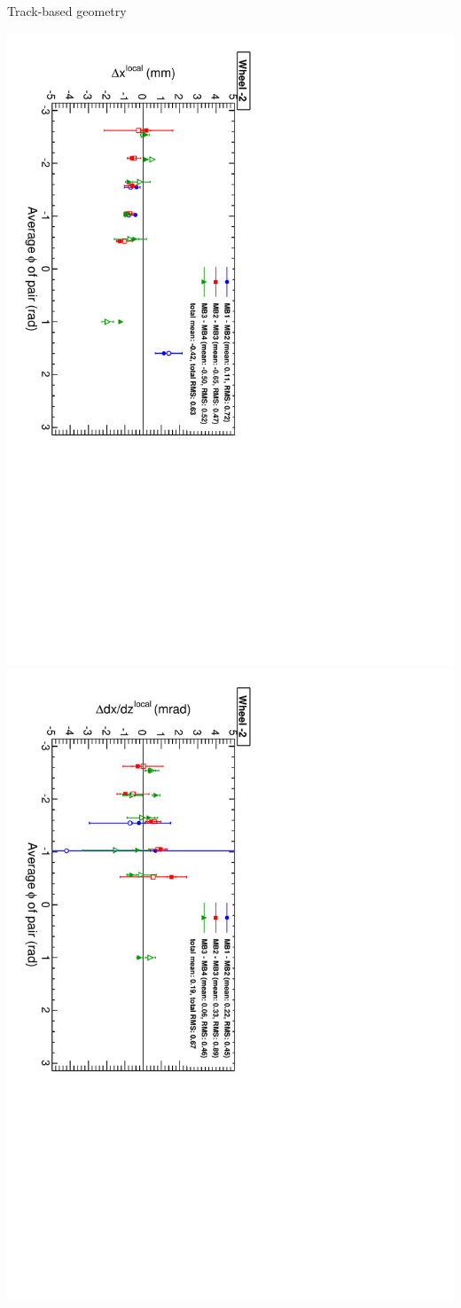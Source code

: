 \documentclass[compress]{beamer}
\begin{document}
\begin{frame}
\begin{center} Track-based geometry \end{center}

\vspace{-0.1 cm}
\includegraphics[height=0.5\linewidth, angle=90]{NOV4_segdiff_x_whm2.pdf}
\includegraphics[height=0.5\linewidth, angle=90]{NOV4_segdiff_dxdz_whm2.pdf}
\end{frame}
\end{document}
